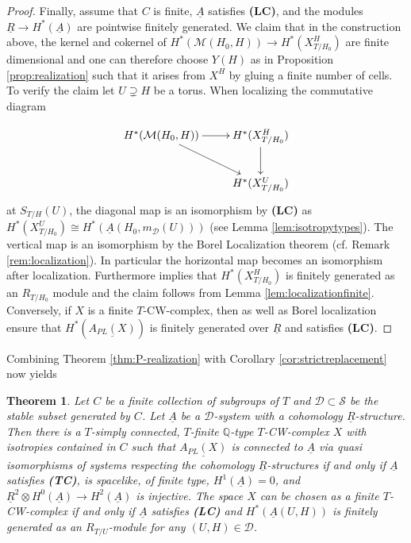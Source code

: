 \documentclass[12pt,a4paper]{article}
\newtheorem{thm}{Theorem}[section]
\theoremstyle{definition}
\begin{document}
\begin{proof}
Finally, assume that $C$ is finite, $\underline{A}$ satisfies \textbf{(LC)}, and the modules $\underline{R}\rightarrow H^*(\underline{A})$ are pointwise finitely generated. We claim that in the construction above, the kernel and cokernel of $H^*(\mathcal{M}(H_0,H))\rightarrow H^*(X^H_{T/H_0})$ are finite dimensional and one can therefore choose $Y(H)$ as in Proposition \ref{prop:realization} such that it arises from $X^H$ by gluing a finite number of cells. To verify the claim let $U\supsetneq H$ be a torus. When localizing the commutative diagram

\[\xymatrix{H^*(\mathcal{M}(H_0,H))\ar[r]\ar[dr]& H^*(X^H_{T/H_0})\ar[d]\\
& H^*(X^U_{T/H_0})
}\]
at $S_{T/H}(U)$,
the diagonal map is an isomorphism by \textbf{(LC)} as $H^*(X^U_{T/H_0})\cong H^*(\underline{A}(H_0,m_\mathcal{D}(U)))$ (see Lemma \ref{lem:isotropytypes}). The vertical map is an isomorphism by the Borel Localization theorem (cf. Remark \ref{rem:localization}). In particular the horizontal map becomes an isomorphism after localization. Furthermore \cite[Proposition 3.10.1]{AP} implies that $H^*(X^H_{T/H_0})$ is finitely generated as an $R_{T/H_0}$ module and the claim follows from Lemma \ref{lem:localizationfinite}. Conversely, if $X$ is a finite $T$-CW-complex, then \cite[Proposition 3.10.1]{AP} as well as Borel localization ensure that $H^*(\underline{A_{PL}(X)})$ is finitely generated over $\underline{R}$ and satisfies \textbf{(LC)}.
\end{proof}

Combining Theorem \ref{thm:P-realization} with Corollary \ref{cor:strictreplacement} now yields

\begin{thm}\label{thm:R-realization}
Let $C$ be a finite collection of subgroups of $T$ and $\mathcal{D}\subset \mathcal{S}$ be the stable subset generated by $C$. Let $\underline{A}$ be a $\mathcal{D}$-system with a cohomology $\underline{R}$-structure. Then there is a $T$-simply connected, $T$-finite $\mathbb{Q}$-type $T$-CW-complex $X$ with isotropies contained in $C$ such that $\underline{A_{PL}(X)}$ is connected to $\underline{A}$ via quasi isomorphisms of systems respecting the cohomology $\underline{R}$-structures if and only if $\underline{A}$ satisfies \textbf{(TC)}, is spacelike, of finite type, $H^1(\underline{A})=0$, and $\underline{R}^2\otimes H^0(\underline{A})\rightarrow H^2(\underline{A})$ is injective. The space $X$ can be chosen as a finite $T$-CW-complex if and only if $\underline{A}$ satisfies \textbf{(LC)} and $H^*(\underline{A}(U,H))$ is finitely generated as an $R_{T/U}$-module for any $(U,H)\in\mathcal{D}$.
\end{thm}
\end{document}
